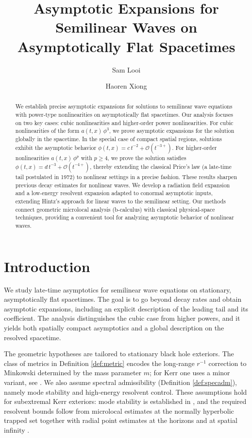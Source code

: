 \documentclass[10pt,a4paper,reqno]{amsart}
\title{Asymptotic Expansions for Semilinear Waves on Asymptotically Flat Spacetimes}
\author[S. Looi]{Sam Looi}
\author[H. Xiong]{Haoren Xiong}
\theoremstyle{definition}
\theoremstyle{remark}
\numberwithin{equation}{section}
\begin{document}
\begin{abstract}
We establish precise asymptotic expansions for solutions to semilinear wave equations with power-type nonlinearities on asymptotically flat spacetimes. Our analysis focuses on two key cases: cubic nonlinearities and higher-order power nonlinearities. For cubic nonlinearities of the form $a(t,x) \, \phi^3$, we prove asymptotic expansions for the solution globally in the spacetime. In the special case of compact spatial regions, solutions exhibit the asymptotic behavior $\phi(t, x) = c \, t^{-2} + \mathcal{O}(t^{-3+})$. For higher-order nonlinearities $a(t,x) \, \phi^p$ with $p \geq 4$, we prove the solution satisfies $\phi(t, x) = d \, t^{-3} + \mathcal{O}(t^{-4+})$, thereby extending the classical Price's law (a late-time tail postulated in 1972) to nonlinear settings in a precise fashion. These results sharpen previous decay estimates for nonlinear waves. We develop a radiation field expansion and a low-energy resolvent expansion adapted to conormal asymptotic inputs, extending Hintz’s approach for linear waves to the semilinear setting. Our methods connect geometric microlocal analysis (b-calculus) with classical physical-space techniques, providing a convenient tool for analyzing asymptotic behavior of nonlinear waves. 
\end{abstract}

\maketitle

\section{Introduction}

We study late-time asymptotics for semilinear wave equations on stationary, asymptotically flat spacetimes. The goal is to go beyond decay rates and obtain asymptotic expansions, including an explicit description of the leading tail and its coefficient. The analysis distinguishes the cubic case from higher powers, and it yields both spatially compact asymptotics and a global description on the resolved spacetime.

The geometric hypotheses are tailored to stationary black hole exteriors. The class of metrics in Definition \ref{def:metric} encodes the long-range $r^{-1}$ correction to Minkowski determined by the mass parameter $m$; for Kerr one uses a minor variant, see \cite[Section 4.1]{Hin22}. We also assume spectral admissibility (Definition \ref{def:specadm}), namely mode stability and high-energy resolvent control. These assumptions hold for subextremal Kerr exteriors: mode stability is established in \cite{WhitingKerrModeStability, ShlapentokhRothmanModeStability}, and the required resolvent bounds follow from microlocal estimates at the normally hyperbolic trapped set \cite{WunschZworskiResolventTrapped,Dyatlov2015,DyatlovSpectralGaps} together with radial point estimates at the horizons and at spatial infinity \cite{VasyMicroKerrdS,VasyLAPLag}.
\end{document}
